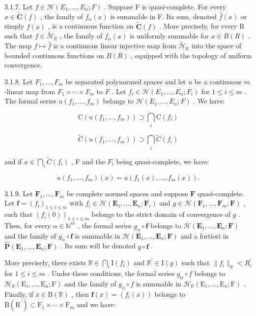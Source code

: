 3.1.7. Let \(f \in \mathcal{H}(E_1, \ldots, E_n; F)\) . Suppose F is quasi-complete. For every \(x \in \tilde{\mathbf{C}}(f)\) , the family of \(f_{\alpha}(x)\) is summable in F. Its sum, denoted \(\hat{f}(x)\) or simply \(f(x)\) , is a continuous function on \(\tilde{\mathbf{C}}(f)\) . More precisely, for every R such that \(f \in \tilde{\mathcal{H}}_{\mathbb{R}}\) , the family of \(f_{\alpha}(x)\) is uniformly summable for \(x \in B(R)\) . The map \(f \mapsto \hat{f}\) is a continuous linear injective map from \(\tilde{\mathcal{H}}_{\mathbb{R}}\) into the space of bounded continuous functions on \(B(R)\) , equipped with the topology of uniform convergence.

3.1.8. Let \(F_1, \ldots, F_m\) be separated polynormed spaces and let \(u\) be a continuous \(m\) -linear map from \(F_1 \times \cdots \times F_m\) to \(F\) . Let \(f_i \in \mathcal{H}(E_1, \ldots, E_n; F_i)\) for \(1 \leqslant i \leqslant m\) . The formal series \(u(f_1, \ldots, f_m)\) belongs to \(\mathcal{H}(E_1, \ldots, E_n; F)\) . We have:

\[
\mathrm{C} (u (f _ {1}, \dots , f _ {m})) \supset \bigcap_ {i} \mathrm{C} (f _ {i})
\]

\[
\tilde {C} (u (f _ {1}, \dots , f _ {m})) \supset \bigcap_ {i} \tilde {C} (f _ {i})
\]

and if \(x \in \bigcap_{i} \tilde{C}(f_i)\) , F and the \(F_i\) being quasi-complete, we have:

\[
u (f _ {1}, \dots , f _ {m}) (x) = u (f _ {1} (x), \dots , f _ {m} (x)).
\]

3.1.9. Let \(\mathbf{F}_1, \ldots, \mathbf{F}_m\) be complete normed spaces and suppose \(\mathbf{F}\) quasi-complete. Let \(\mathbf{f} = (f_i)_{1 \leqslant i \leqslant m}\) with \(f_i \in \mathcal{H}(\mathbf{E}_1, \ldots, \mathbf{E}_n; \mathbf{F}_i)\) and \(g \in \mathcal{H}(\mathbf{F}_1, \ldots, \mathbf{F}_m; \mathbf{F})\) , such that \((f_i(0))_{1 \leqslant i \leqslant m}\) belongs to the strict domain of convergence of \(g\) . Then, for every \(\alpha \in \mathbb{N}^m\) , the formal series \(g_\alpha \circ \mathbf{f}\) belongs to \(\mathcal{H}(\mathbf{E}_1, \ldots, \mathbf{E}_n; \mathbf{F})\) and the family of \(g_\alpha \circ \mathbf{f}\) is summable in \(\mathcal{H}(\mathbf{E}_1, \ldots, \mathbf{E}_n; \mathbf{F})\) and a fortiori in \(\hat{\mathbf{P}}(\mathbf{E}_1, \ldots, \mathbf{E}_n; \mathbf{F})\) . Its sum will be denoted \(g \circ \mathbf{f}\) .

More precisely, there exists \(\mathbb{R}\in\bigcap_{i}\mathrm{I}(f_{i})\) and \(\mathbb{R}^{\prime}\in\mathrm{I}(g)\) such that \(\|f_{i}\|_{\mathbb{R}}<R_{i}^{\prime}\) for \(1\leqslant i\leqslant m\) . Under these conditions, the formal series \(g_{\alpha}\circ f\) belongs to \(\mathcal{H}_{\mathbb{R}}(\mathrm{E}_{1},\ldots,\mathrm{E}_{n};\mathrm{F})\) and the family of \(g_{\alpha}\circ f\) is summable in \(\mathcal{H}_{\mathbb{R}}(\mathrm{E}_{1},\ldots,\mathrm{E}_{n};\mathrm{F})\) . Finally, if \(x\in\mathrm{B}(\mathbb{R})\) , then \(\mathbf{f}(x)=(f_{i}(x))\) belongs to \(\mathrm{B}(\mathrm{R}^{\prime})\subset\mathrm{F}_{1}\times\cdots\times\mathrm{F}_{m}\) and we have:


